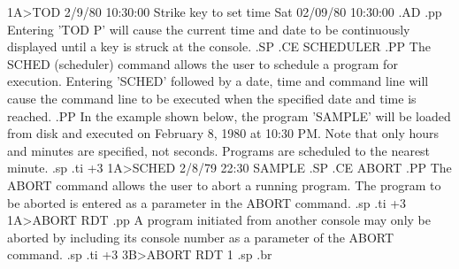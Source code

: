    1A>TOD 2/9/80 10:30:00
   Strike key to set time
   Sat 02/09/80 10:30:00
.AD
.pp
Entering 'TOD P' will cause the current time and date to be
continuously displayed until a key is struck at the console.
.SP
.CE
SCHEDULER
.PP
The SCHED (scheduler) command allows the user to schedule a program
for execution.  Entering 'SCHED' followed by a date, time and command
line will cause the command line to be executed when the specified
date and time is reached.
.PP
In the example shown below, the program 'SAMPLE' will be loaded from
disk and executed on February 8, 1980 at 10:30 PM.
Note that only hours and minutes are specified, not seconds.  Programs
are scheduled to the nearest minute.
.sp
.ti +3
1A>SCHED 2/8/79 22:30 SAMPLE
.SP
.CE
ABORT
.PP
The  ABORT  command  allows the user  to  abort  a  running
program.   The  program  to  be  aborted is  entered  as  a
parameter in the ABORT command.
.sp
.ti +3
1A>ABORT RDT
.pp
A  program  initiated  from another  console  may  only  be
aborted by including its console number as
a parameter of the ABORT command.
.sp
.ti +3
3B>ABORT RDT 1
.sp
.br
